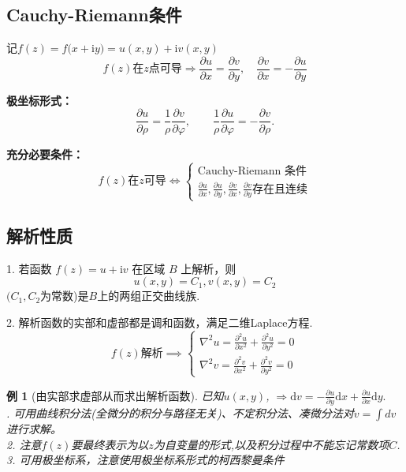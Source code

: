 \documentclass[11pt, a4paper, twoside]{ctexbook}
\newtheorem{example}[theorem]{例}
\begin{document}
\subsection{Cauchy-Riemann条件}

记$f( z) = f( x+ $i$y) = u( x, y) + $i$v( x, y)$
$$f(z)\text{在}z\text{点可导}\Rightarrow\frac{\partial u}{\partial x} = \frac{\partial v}{\partial y}, \quad \frac{\partial v}{\partial x} = -\frac{\partial u}{\partial y}$$

\textbf{极坐标形式：}$$\frac{\partial u}{\partial \rho}=\frac1\rho\frac{\partial v}{\partial\varphi},\qquad \frac1\rho\frac{\partial u}{\partial\varphi}=-\frac{\partial v}{\partial\rho}.$$

\textbf{充分必要条件：}
$$
f(z)\text{在}z\text{可导}\iff\begin{cases}\text{Cauchy-Riemann 条件}\\\frac{\partial u}{\partial x},\frac{\partial u}{\partial y},\frac{\partial v}{\partial x},\frac{\partial v}{\partial y}\text{存在且连续}\end{cases}
$$
\subsection{解析性质}
1. 若函数 $f( z) = u+ $i$v$ 在区域 $B$ 上解析，则
$$u(x,y)=C_1,v(x,y)=C_2$$
$(C_1,C_2$为常数)是$B$上的两组正交曲线族. 

2. 解析函数的实部和虚部都是调和函数，满足二维Laplace方程.
$$f(z)\text{解析}\implies\begin{cases}\nabla^2u=\frac{\partial^2u}{\partial x^2}+\frac{\partial^2 u}{\partial y^2}=0\\\nabla^2v=\frac{\partial^2 v}{\partial x^2}+\frac{\partial^2 v}{\partial y^2}=0\end{cases}$$
\begin{example}[由实部求虚部从而求出解析函数]
已知$u(x,y)$, $\Rightarrow \mathrm{d}v=-\frac{\partial u}{\partial y}\mathrm{d}x+\frac{\partial u}{\partial x}\mathrm{d}y.$ \\
. 可用曲线积分法(全微分的积分与路径无关)、不定积分法、凑微分法对$v = \int dv$进行求解。\\
2. 注意$f(z)$要最终表示为以$z$为自变量的形式,以及积分过程中不能忘记常数项$C$.\\
3. 可用极坐标系，注意使用极坐标系形式的柯西黎曼条件  \\
\end{example}
\end{document}
